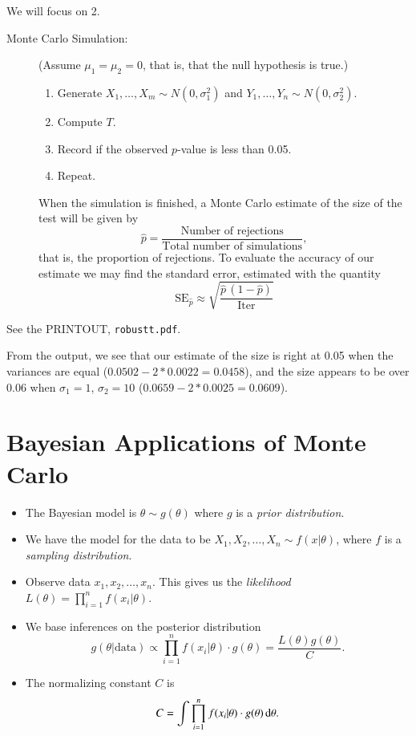 \documentclass[11pt,english]{scrbook}
\begin{document}
We will focus on 2.

\begin{description}
\item[{Monte Carlo Simulation:}] (Assume \(\mu_{1}=\mu_{2}=0\), that is, that the null hypothesis is true.)
\begin{enumerate}
\item Generate \(X_{1},\ldots,X_{m}\sim N(0,\sigma_{1}^{2})\) and \(Y_{1},\ldots,Y_{n}\sim N(0,\sigma_{2}^{2})\).
\item Compute \(T\).
\item Record if the observed \(p\)-value is less than 0.05.
\item Repeat.
\end{enumerate}
When the simulation is finished, a Monte Carlo estimate of the size of the test will be given by
\[
  \hat{p}=\frac{\mbox{Number of rejections}}{\mbox{Total number of simulations}},
  \]
that is, the proportion of rejections. To evaluate the accuracy of our estimate we may find the standard error, estimated with the quantity
\[
  \mathrm{SE}_{\hat{p}} \approx \sqrt{\frac{\hat{p}\,(1-\hat{p})}{\mathrm{Iter}}}
  \]
\end{description}

See the PRINTOUT, \texttt{robustt.pdf}.

From the output, we see that our estimate of the size is right at 0.05 when the variances are equal (\(0.0502-2*0.0022=0.0458\)), and the size appears to be over 0.06 when \(\sigma_{1}=1\), \(\sigma_{2}=10\) (\(0.0659-2*0.0025=0.0609\)).  

\section{Bayesian Applications of Monte Carlo}
\label{sec:org0b3d9d4}

\begin{itemize}
\item The Bayesian model is \(\theta \sim g(\theta)\) where \(g\) is a \emph{prior distribution}.

\item We have the model for the data to be  \(X_{1},X_{2},\ldots, X_{n}\sim f(x|\theta)\), where \(f\) is a \emph{sampling distribution}.

\item Observe data \(x_{1},x_{2},\ldots,x_{n}\).  This gives us the \emph{likelihood} \(L(\theta) =  \prod_{i=1}^{n}f(x_{i}|\theta)\).

\item We base inferences on the posterior distribution
\[
  g(\theta | \mbox{data}) \propto \prod_{i=1}^{n}f(x_{i}|\theta)\cdot g(\theta) = \frac{L(\theta)g(\theta)}{C}.
  \]

\item The normalizing constant \(C\) is
\[
  C = \int \prod_{i=1}^{n}f(x_{i}|\theta)\cdot g(\theta)\,\mathrm{d} \theta.
  \]
\end{itemize}
\end{document}
